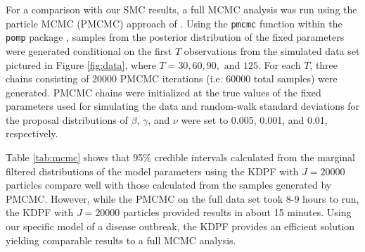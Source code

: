 \documentclass{elsarticle}
\begin{document}
For a comparison with our SMC results, a full MCMC analysis was run using the particle MCMC (PMCMC) approach of \citet{Andr:Douc:Hol:pmcmc:2010}. Using the {\tt pmcmc} function within the {\tt pomp} package \citep{pomp}, samples from the posterior distribution of the fixed parameters were generated conditional on the first $T$ observations from the simulated data set pictured in Figure \ref{fig:data}, where $T = 30, 60, 90, \mbox{ and } 125$. For each $T$, three chains consisting of 20000 PMCMC iterations (i.e. 60000 total samples) were generated. PMCMC chains were initialized at the true values of the fixed parameters used for simulating the data and random-walk standard deviations for the proposal distributions of $\beta$, $\gamma$, and $\nu$ were set to 0.005, 0.001, and 0.01, respectively.

Table \ref{tab:mcmc} shows that 95\% credible intervals calculated from the marginal filtered distributions of the model parameters using the KDPF with $J = 20000$ particles compare well with those calculated from the samples generated by PMCMC. However, while the PMCMC on the full data set took 8-9 hours to run, the KDPF with $J = 20000$ particles provided results in about 15 minutes. Using our specific model of a disease outbreak, the KDPF provides an efficient solution yielding comparable results to a full MCMC analysis.
\end{document}
